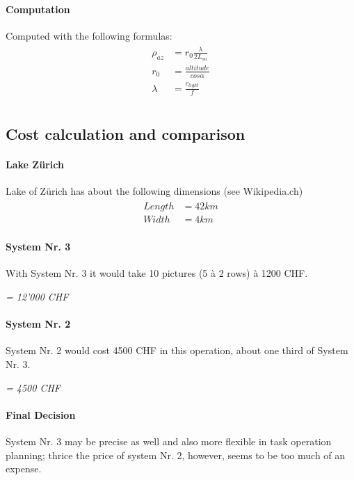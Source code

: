 \documentclass[11pt, a4paper, BCOR12mm, headexclude, footexclude, twoside,%
openright]{scrartcl}
\numberwithin{equation}{section}
\numberwithin{figure}{section}
\numberwithin{table}{section}
\begin{document}
\paragraph{Computation}Computed with the following formulas:
\begin{align}
\begin{split}
{\rho}_{az}&={r}_{0} \frac{\lambda}{2{L}_{sa}} \\[0.15cm]
{r}_{0}&=\frac{altitude}{cos{\alpha}}\\[0.15cm]
\lambda&=\frac{{c}_{light}}{f}\\
\end{split}
\end{align}

\subsection{Cost calculation and comparison}
\paragraph{Lake Zürich}
Lake of Zürich has about the following dimensions (see Wikipedia.ch)
\begin{align}
\begin{split}
Length &= 42 km\\
Width &= 4 km
\end{split}
\end{align}
\paragraph{System Nr. 3}With System Nr. 3 it would take 10 pictures (5 à 2 rows) à 1200 CHF.
\begin{center}
\emph{= 12'000 CHF}
\end{center}

\paragraph{System Nr. 2}System Nr. 2 would cost 4500 CHF in this operation, about one third of System Nr. 3.
\begin{center}
\emph{= 4500 CHF}
\end{center}

\paragraph{Final Decision}System Nr. 3 may be precise as well and also more flexible in task operation planning; thrice the price of system Nr. 2, however, seems to be too much of an expense.
\end{document}
